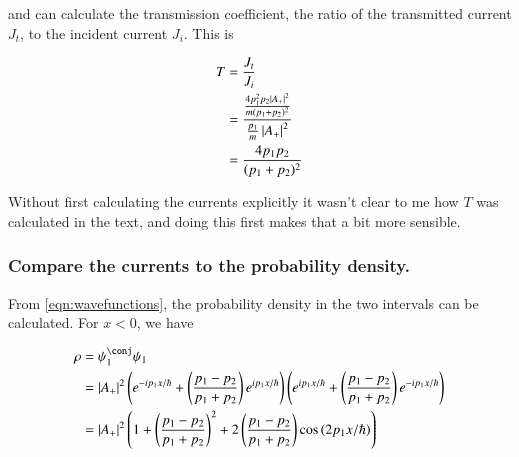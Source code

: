 \documentclass{article}
\begin{document}
and can calculate the transmission coefficient, the ratio of the transmitted current $J_t$, to the incident current $J_i$.  This is

\begin{align*}
T
&= \frac{J_t}{J_i} \\
&=
\frac{
\frac{ 4 p_1^2 p_2 \left\lvert{ A_{+} }\right\rvert^2}{m (p_1 + p_2)^2}
}
{
\frac{ p_1}{m} \left\lvert{ A_{+} }\right\rvert^2
} \\
&=
\frac{ 4 p_1 p_2 }{ (p_1 + p_2)^2}
\end{align*}

Without first calculating the currents explicitly it wasn't clear to me how $T$ was calculated in the text, and doing this first
makes that a bit more sensible.

\subsubsection{ Compare the currents to the probability density. }

From \ref{eqn:wavefunctions}, the probability density in the two intervals
can be calculated.  For $x<0$, we have

\begin{align*}
\rho
&= \psi_1^\conj \psi_1 \\
&=
\Abs{ A_{+} }^2
\left(
e^{ -i p_1 x/\hbar }
+\left( \frac{ p_1 - p_2 }{p_1 + p_2} \right) e^{ i p_1 x/\hbar }
\right)
\left(
e^{ i p_1 x/\hbar }
+\left( \frac{ p_1 - p_2 }{p_1 + p_2} \right) e^{ -i p_1 x/\hbar }
\right)
\\
&=
\Abs{ A_{+} }^2
\left(
1
+
\left( \frac{ p_1 - p_2 }{p_1 + p_2} \right)^2
+
2 \left( \frac{ p_1 - p_2 }{p_1 + p_2} \right) \cos\left( 2 p_1 x/\hbar \right)
\right) \\
\end{align*}
\end{document}
